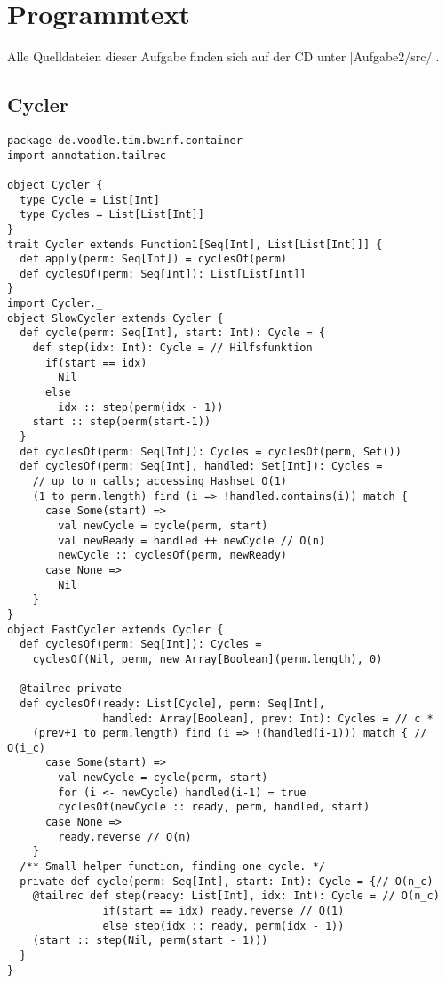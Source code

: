 \section{Programmtext}
\label{code2}
Alle Quelldateien dieser Aufgabe finden sich auf der CD unter |Aufgabe2/src/|.
\clearpage\subsection{Cycler}
\begin{lstlisting}
package de.voodle.tim.bwinf.container
import annotation.tailrec

object Cycler {
  type Cycle = List[Int]
  type Cycles = List[List[Int]]
}
trait Cycler extends Function1[Seq[Int], List[List[Int]]] {
  def apply(perm: Seq[Int]) = cyclesOf(perm)
  def cyclesOf(perm: Seq[Int]): List[List[Int]]
}
import Cycler._
object SlowCycler extends Cycler {
  def cycle(perm: Seq[Int], start: Int): Cycle = {
    def step(idx: Int): Cycle = // Hilfsfunktion
      if(start == idx)
        Nil
      else
        idx :: step(perm(idx - 1))
    start :: step(perm(start-1))
  }
  def cyclesOf(perm: Seq[Int]): Cycles = cyclesOf(perm, Set())
  def cyclesOf(perm: Seq[Int], handled: Set[Int]): Cycles =
    // up to n calls; accessing Hashset O(1)
    (1 to perm.length) find (i => !handled.contains(i)) match {
      case Some(start) =>
        val newCycle = cycle(perm, start)
        val newReady = handled ++ newCycle // O(n)
        newCycle :: cyclesOf(perm, newReady)
      case None =>
        Nil
    }
}
object FastCycler extends Cycler {
  def cyclesOf(perm: Seq[Int]): Cycles =
    cyclesOf(Nil, perm, new Array[Boolean](perm.length), 0)

  @tailrec private
  def cyclesOf(ready: List[Cycle], perm: Seq[Int],
               handled: Array[Boolean], prev: Int): Cycles = // c *
    (prev+1 to perm.length) find (i => !(handled(i-1))) match { // O(i_c)
      case Some(start) =>
        val newCycle = cycle(perm, start)
        for (i <- newCycle) handled(i-1) = true
        cyclesOf(newCycle :: ready, perm, handled, start)
      case None =>
        ready.reverse // O(n)
    }
  /** Small helper function, finding one cycle. */
  private def cycle(perm: Seq[Int], start: Int): Cycle = {// O(n_c)
    @tailrec def step(ready: List[Int], idx: Int): Cycle = // O(n_c)
               if(start == idx) ready.reverse // O(1)
               else step(idx :: ready, perm(idx - 1))
    (start :: step(Nil, perm(start - 1)))
  }
}
\end{lstlisting}


